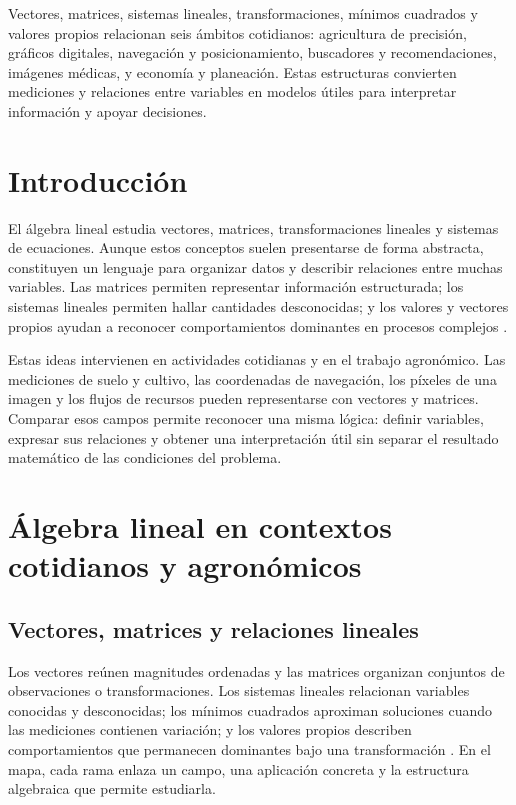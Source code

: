 \documentclass[spanish,letterpaper,oneside]{article}
\begin{document}
\institutionalWatermark[0.08]{\careerwatermarkimage}
\templatePortrait
\templatePagecfg
\onehalfspacing

\begin{abstractd}
Vectores, matrices, sistemas lineales, transformaciones, mínimos cuadrados y valores propios relacionan seis ámbitos cotidianos: agricultura de precisión, gráficos digitales, navegación y posicionamiento, buscadores y recomendaciones, imágenes médicas, y economía y planeación. Estas estructuras convierten mediciones y relaciones entre variables en modelos útiles para interpretar información y apoyar decisiones.
\end{abstractd}

\templateIndex
\templateFinalcfg

\section{Introducción}
El álgebra lineal estudia vectores, matrices, transformaciones lineales y sistemas de ecuaciones. Aunque estos conceptos suelen presentarse de forma abstracta, constituyen un lenguaje para organizar datos y describir relaciones entre muchas variables. Las matrices permiten representar información estructurada; los sistemas lineales permiten hallar cantidades desconocidas; y los valores y vectores propios ayudan a reconocer comportamientos dominantes en procesos complejos \citep{lay2021linear,strang2023introduction}.

Estas ideas intervienen en actividades cotidianas y en el trabajo agronómico. Las mediciones de suelo y cultivo, las coordenadas de navegación, los píxeles de una imagen y los flujos de recursos pueden representarse con vectores y matrices. Comparar esos campos permite reconocer una misma lógica: definir variables, expresar sus relaciones y obtener una interpretación útil sin separar el resultado matemático de las condiciones del problema.

\section{Álgebra lineal en contextos cotidianos y agronómicos}
\subsection{Vectores, matrices y relaciones lineales}
Los vectores reúnen magnitudes ordenadas y las matrices organizan conjuntos de observaciones o transformaciones. Los sistemas lineales relacionan variables conocidas y desconocidas; los mínimos cuadrados aproximan soluciones cuando las mediciones contienen variación; y los valores propios describen comportamientos que permanecen dominantes bajo una transformación \citep{meyer2000matrix}. En el mapa, cada rama enlaza un campo, una aplicación concreta y la estructura algebraica que permite estudiarla.
\end{document}
